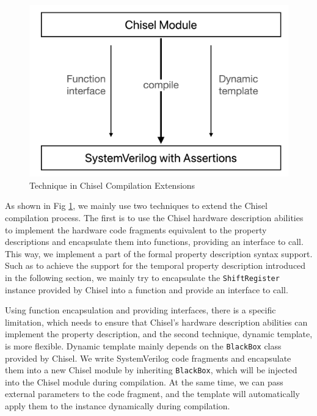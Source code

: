 \documentclass[conference]{IEEEtran}
\theoremstyle{definition}
\begin{document}
\begin{figure}[!htbp]
    \begin{center}
    \includegraphics[width=0.9\linewidth]{pics/ChiselFVSubstitute.png}
    \caption{Technique in Chisel Compilation Extensions}
    \label{fig: ChiselFVSubstitute}
    \end{center}
\end{figure}

As shown in Fig \ref{fig: ChiselFVSubstitute}, we mainly use two techniques to extend the Chisel compilation process. The first is to use the Chisel hardware description abilities to implement the hardware code fragments equivalent to the property descriptions and encapsulate them into functions, providing an interface to call. This way, we implement a part of the formal property description syntax support.
Such as to achieve the support for the temporal property description introduced in the following section, we mainly try to encapsulate the \verb|ShiftRegister| instance provided by Chisel into a function and provide an interface to call.

Using function encapsulation and providing interfaces, there is a specific limitation, which needs to ensure that Chisel's hardware description abilities can implement the property description, and the second technique, dynamic template, is more flexible.
Dynamic template mainly depends on the \verb|BlackBox| class provided by Chisel. We write SystemVerilog code fragments and encapsulate them into a new Chisel module by inheriting \verb|BlackBox|, which will be injected into the Chisel module during compilation. At the same time, we can pass external parameters to the code fragment, and the template will automatically apply them to the instance dynamically during compilation.
\end{document}

